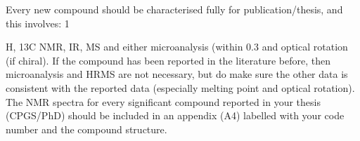 Every new compound should be
characterised fully for publication/thesis, and this involves: 1

H, 13C NMR, IR, MS and either
microanalysis (within 0.3%
and optical rotation (if chiral). If the compound has been reported in the literature before, then
microanalysis and HRMS are not necessary, but do make sure the other data is consistent with
the reported data (especially melting point and optical rotation). The NMR spectra for every
significant compound reported in your thesis (CPGS/PhD) should be included in an appendix (A4)
labelled with your code number and the compound structure.

